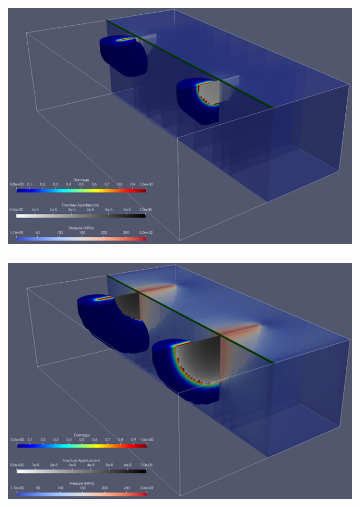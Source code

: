 \noindent
\hspace{0.5cm}

\begin{figure}[h]
\begin{subfigure}{.45\textwidth}
  \centering
  \includegraphics[width=\linewidth]{Chapter4/figures/3D/t_0.png}
  \caption{}
  \label{fig:parallel_t_0}
\end{subfigure}%
\hspace{1cm}
\begin{subfigure}{.45\textwidth}
  \centering
  \includegraphics[width=\linewidth]{Chapter4/figures/3D/t_30.png}
  \caption{}
  \label{fig:parallel_t_1}
\end{subfigure}%


\end{figure}
